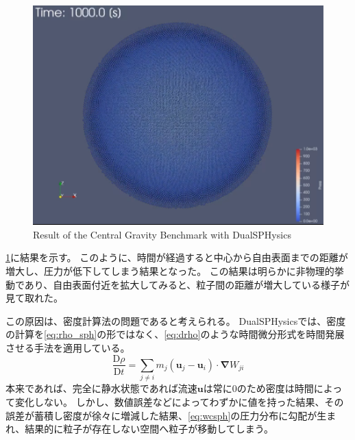 \begin{figure}
\begin{minipage}{.3 \linewidth}
				\includegraphics[clip, width=\linewidth]{img/dsph_snap_1000.png}
			\end{minipage}
			\caption{Result of the Central Gravity Benchmark with DualSPHysics \label{fig:dsph}}
		\end{figure}
		\cref{fig:dsph}に結果を示す。
		このように、時間が経過すると中心から自由表面までの距離が増大し、圧力が低下してしまう結果となった。
		この結果は明らかに非物理的挙動であり、自由表面付近を拡大してみると、粒子間の距離が増大している様子が見て取れた。

		この原因は、密度計算法の問題であると考えられる。
		DualSPHysicsでは、密度の計算を\cref{eq:rho_sph}の形ではなく、\cref{eq:drho}のような時間微分形式を時間発展させる手法を適用している。
		\begin{equation}
			\frac{\mathrm{D} \rho }{\mathrm{D} t} = \sum_{j \neq i} m_j \left( \mathbf{u}_j - \mathbf{u}_i \right) \cdot \mathbf{\nabla} W_{ji} \label{eq:drho}
		\end{equation}
		本来であれば、完全に静水状態であれば流速$\mathbf{u}$は常に0のため密度は時間によって変化しない。
		しかし、数値誤差などによってわずかに値を持った結果、その誤差が蓄積し密度が徐々に増減した結果、\cref{eq:wcsph}の圧力分布に勾配が生まれ、結果的に粒子が存在しない空間へ粒子が移動してしまう。

